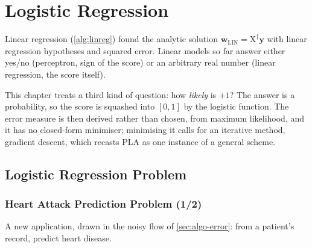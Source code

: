 \chapter{Logistic Regression}

\begin{prev}
    Linear regression (\autoref{alg:linreg}) found the analytic solution
    \(\bm{w}_{\mathrm{LIN}} = \mathrm{X}^\dagger \bm{y}\) with linear regression hypotheses and squared
    error. Linear models so far answer either yes/no (perceptron, sign of the
    score) or an arbitrary real number (linear regression, the score itself).
\end{prev}

This chapter treats a third kind of question: how \emph{likely} is \(+1\)? The
answer is a probability, so the score is squashed into \([0, 1]\) by the
logistic function. The error measure is then derived rather than chosen, from
maximum likelihood, and it has no closed-form minimiser; minimising it calls for
an iterative method, gradient descent, which recasts PLA as one instance of a
general scheme.

\section{Logistic Regression Problem}\label{sec:logreg-problem}


\subsection{Heart Attack Prediction Problem (1/2)}

A new application, drawn in the noisy flow of \autoref{sec:algo-error}: from a
patient's record, predict heart disease.

